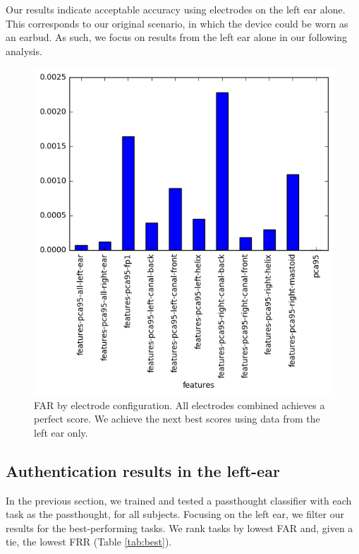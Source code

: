 \documentclass[letterpaper,twocolumn,10pt]{article}
\begin{document}
Our results indicate acceptable accuracy using electrodes on the left ear alone. 
This corresponds to our original scenario, in which the device could be worn as an earbud.
As such, we focus on results from the left ear alone in our following analysis.

\begin{figure}[htbp]
\centering
\includegraphics[width=.9\linewidth]{./figures/mean-far-by-electrode-config.png}
\caption{FAR by electrode configuration. All electrodes combined achieves a perfect score. We achieve the next best scores using data from the left ear only.}
\label{fig:meanByElectrode}
\end{figure}


\subsection{Authentication results in the left-ear}

In the previous section, we trained and tested a passthought classifier with each task as the passthought, for all subjects. Focusing on the left ear, we filter our results for the best-performing tasks. We rank tasks by lowest FAR and, given a tie, the lowest FRR (Table \ref{tab:best}).
\end{document}
